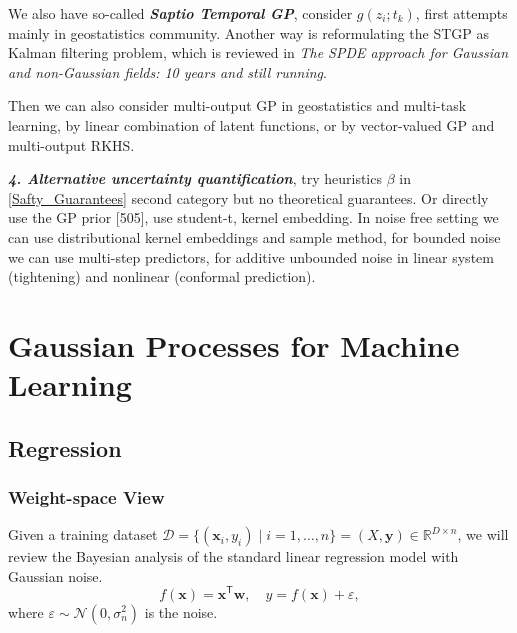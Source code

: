 \documentclass[10pt]{elegantbook}
\newcommand{\mydefination}[1]{\textbf{\textit{\textcolor{structurecolor}{#1}}}}
\begin{document}
We also have so-called \mydefination{Saptio Temporal GP}, consider $g(z_i ; t_k)$, first attempts mainly in geostatistics community. Another way is reformulating
the STGP as Kalman filtering problem, which is reviewed in \textit{The SPDE approach for Gaussian and non-Gaussian fields: 10 years and still running}.

Then we can also consider multi-output GP in geostatistics and multi-task learning, by linear combination of latent functions, or by vector-valued GP and multi-output 
RKHS.

\mydefination{4. Alternative uncertainty quantification}, try heuristics $\beta$ in \ref{Safty_Guarantees} second category but no theoretical guarantees. Or 
directly use the GP prior [505], use student-t, kernel embedding. In noise free setting we can use distributional kernel embeddings and sample method, for 
bounded noise we can use multi-step predictors, for additive unbounded noise in linear system (tightening) and nonlinear (conformal prediction). 

\chapter{Gaussian Processes for Machine Learning}

\section{Regression}

\subsection{Weight-space View}

Given a training dataset $\mathcal{D}=\{( \mathbf{x}_{i}, y_{i} ) \mid i=1, \ldots, n \} = (X, \mathbf y) \in \mathbb R^{D \times n}$,
we will review the Bayesian analysis of the standard linear regression model with Gaussian noise.
\begin{equation}
    f(\mathbf{x})=\mathbf{x}^{\mathsf{T}}\mathbf{w},\quad y=f(\mathbf{x})+\varepsilon,
\end{equation}
where $\varepsilon \sim \mathcal N(0, \sigma_n^2)$ is the noise.
\end{document}
